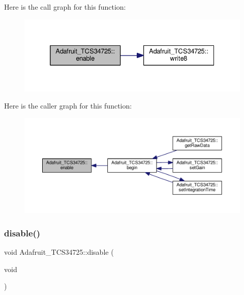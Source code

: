 Here is the call graph for this function\+:\nopagebreak
\begin{figure}[H]
\begin{center}
\leavevmode
\includegraphics[width=332pt]{df/d54/class_adafruit___t_c_s34725_ad9a0e1f4f77d32dc0a6d604f7d1d5586_cgraph}
\end{center}
\end{figure}
Here is the caller graph for this function\+:\nopagebreak
\begin{figure}[H]
\begin{center}
\leavevmode
\includegraphics[width=350pt]{df/d54/class_adafruit___t_c_s34725_ad9a0e1f4f77d32dc0a6d604f7d1d5586_icgraph}
\end{center}
\end{figure}
\mbox{\label{class_adafruit___t_c_s34725_a79ac9b01a540f132d4bbf2edd2d6e8a2}} 
\subsubsection{\texorpdfstring{disable()}{disable()}}
{\footnotesize\ttfamily void Adafruit\+\_\+\+T\+C\+S34725\+::disable (\begin{DoxyParamCaption}\item[{void}]{ }\end{DoxyParamCaption})\hspace{0.3cm}{\ttfamily [private]}}


